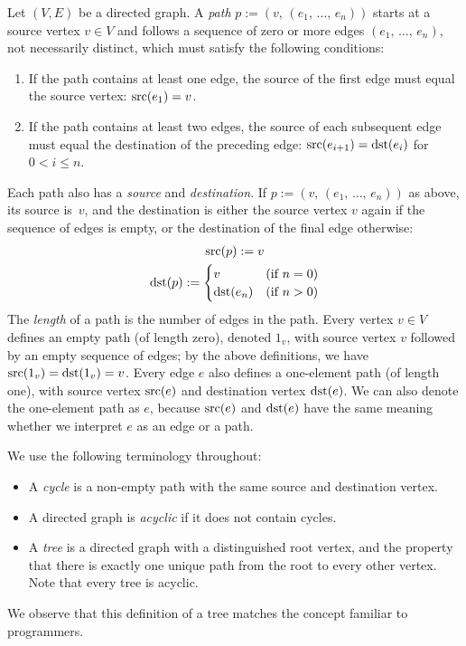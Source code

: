 \documentclass[../generics]{subfiles}
\begin{document}
\begin{definition}\label{digraph path}
Let $(V,E)$ be a directed graph. A \emph{path} $p := (v,\,(e_1,\,\ldots,\,e_n))$ starts at a source vertex $v\in V$ and follows a sequence of zero or more edges $(e_1,\,\ldots,\,e_n)$, not necessarily distinct, which must satisfy the following conditions:
\begin{enumerate}
\item If the path contains at least one edge, the source of the first edge must equal the source vertex: $\operatorname{src}(e_1)=v$.
\item If the path contains at least two edges, the source of each subsequent edge must equal the destination of the preceding edge: $\operatorname{src}(e_{i+1})=\operatorname{dst}(e_i)$ for $0<i\leq n$.
\end{enumerate}
Each path also has a \emph{source} and \emph{destination}. If $p := (v,\,(e_1,\,\ldots,\,e_n))$ as above, its source is~$v$, and the destination is either the source vertex $v$ again if the sequence of edges is empty, or the destination of the final edge otherwise:
\begin{gather*}
\operatorname{src}(p) := v\\
\operatorname{dst}(p) := \begin{cases}
v&\text{(if $n=0$)}\\
\operatorname{dst}(e_n)&\text{(if $n>0$)}
\end{cases}
\end{gather*}
The \emph{length} of a path is the number of edges in the path. Every vertex $v\in V$ defines an empty path (of length zero), denoted $1_v$, with source vertex $v$ followed by an empty sequence of edges; by the above definitions, we have $\operatorname{src}(1_v)=\operatorname{dst}(1_v)=v$. Every edge $e$ also defines a one-element path (of length one), with source vertex $\operatorname{src}(e)$ and destination vertex $\operatorname{dst}(e)$. We can also denote the one-element path as $e$, because $\operatorname{src}(e)$ and $\operatorname{dst}(e)$ have the same meaning whether we interpret $e$ as an edge or a path.
\end{definition}

\begin{definition}\label{dag def}
We use the following terminology throughout:
\begin{itemize}
\item A \emph{cycle} is a non-empty path with the same source and destination vertex.

\item A directed graph is \emph{acyclic} if it does not contain cycles.

\item A \emph{tree} is a directed graph with a distinguished root vertex, and the property that there is exactly one unique path from the root to every other vertex. Note that every tree is acyclic.
\end{itemize}
We observe that this definition of a tree matches the concept familiar to programmers.
\end{definition}
\end{document}
